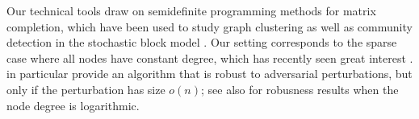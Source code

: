 

Our technical tools draw on semidefinite programming methods for matrix 
completion, which have been used to study graph clustering as well 
as community detection in the stochastic block model \citep{holland1983stochastic,condon2001algorithms}. 
Our setting corresponds to the sparse case where all nodes have constant degree, 
which has recently seen great interest \citep{decelle2011asymptotic,
mossel2012stochastic,mossel2013proof,mossel2013belief,
massoulie2014community,guedon2014community,mossel2015consistency,
chin2015stochastic,abbe2015community,makarychev2015learning}. 
\citet{makarychev2015learning} in particular provide an algorithm that is 
robust to adversarial perturbations, but only if the perturbation has 
size $o(n)$; see also \citet{cai2015robust} for robusness results when 
the node degree is logarithmic.

